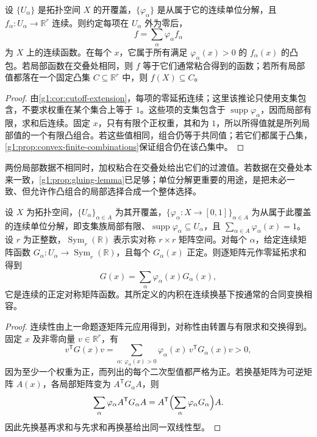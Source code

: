 \begin{proposition}\label{g1:prop:weighted-gluing}
	设 \(\{U_\alpha\}\) 是拓扑空间 \(X\) 的开覆盖，\(\{\varphi_\alpha\}\) 是从属于它的连续单位分解，且 \(f_\alpha:U_\alpha\rightarrow\mathbb R^r\) 连续。则约定每项在 \(U_\alpha\) 外为零后，
	\[
		f=\sum_\alpha\varphi_\alpha f_\alpha
	\]
	为 \(X\) 上的连续函数。在每个 \(x\)，它属于所有满足 \(\varphi_\alpha(x)>0\) 的 \(f_\alpha(x)\) 的凸包。若局部函数在交叠处相同，则 \(f\) 等于它们通常粘合得到的函数；若所有局部值都落在一个固定凸集 \(C\subseteq\mathbb R^r\) 中，则 \(f(X)\subseteq C\)。
\end{proposition}
\begin{proof}
	由\cref{g1:cor:cutoff-extension}，每项的零延拓连续；这里该推论只使用支集包含，不要求权重在某个集合上等于 \(1\)。这些项的支集包含于 \(\operatorname{supp}\varphi_\alpha\)，因而局部有限，求和后连续。固定 \(x\)，只有有限个正权重，其和为 \(1\)，所以所得值就是所列局部值的一个有限凸组合。若这些值相同，组合仍等于共同值；若它们都属于凸集，\cref{g1:prop:convex-finite-combinations}保证组合仍在该凸集中。
\end{proof}

两份局部数据不相同时，加权粘合在交叠处给出它们的过渡值。若数据在交叠处本来一致，\cref{g1:prop:gluing-lemma}已足够；单位分解更重要的用途，是把未必一致、但允许作凸组合的局部选择合成一个整体选择。

\begin{proposition}\label{g1:prop:positive-form-gluing}
	设 \(X\) 为拓扑空间，\(\{U_\alpha\}_{\alpha\in A}\) 为其开覆盖，\(\{\varphi_\alpha:X\to[0,1]\}_{\alpha\in A}\) 为从属于此覆盖的连续单位分解，即支集族局部有限、\(\operatorname{supp}\varphi_\alpha\subseteq U_\alpha\)，且 \(\sum_{\alpha\in A}\varphi_\alpha(x)=1\)。设 \(r\) 为正整数，\(\operatorname{Sym}_r(\mathbb R)\) 表示实对称 \(r\times r\) 矩阵空间。对每个 \(\alpha\)，给定连续矩阵函数 \(G_\alpha:U_\alpha\rightarrow\operatorname{Sym}_r(\mathbb R)\)，且每个 \(G_\alpha(x)\) 正定。则逐矩阵元作零延拓求和得到
	\[
		G(x)=\sum_\alpha\varphi_\alpha(x)G_\alpha(x),
	\]
	它是连续的正定对称矩阵函数。其所定义的内积在连续换基下按通常的合同变换相容。
\end{proposition}
\begin{proof}
	连续性由上一命题逐矩阵元应用得到，对称性由转置与有限求和交换得到。固定 \(x\) 及非零向量 \(v\in\mathbb R^r\)，有
	\[
		v^{\mathsf T}G(x)v=\sum_{\alpha:\,\varphi_\alpha(x)>0}
		\varphi_\alpha(x)\,v^{\mathsf T}G_\alpha(x)v>0,
	\]
	因为至少一个权重为正，而列出的每个二次型值都严格为正。若换基矩阵为可逆矩阵 \(A(x)\)，各局部矩阵变为 \(A^{\mathsf T}G_\alpha A\)，则
	\[
		\sum_\alpha\varphi_\alpha A^{\mathsf T}G_\alpha A
		=A^{\mathsf T}\Bigl(\sum_\alpha\varphi_\alpha G_\alpha\Bigr)A.
	\]
	因此先换基再求和与先求和再换基给出同一双线性型。
\end{proof}

